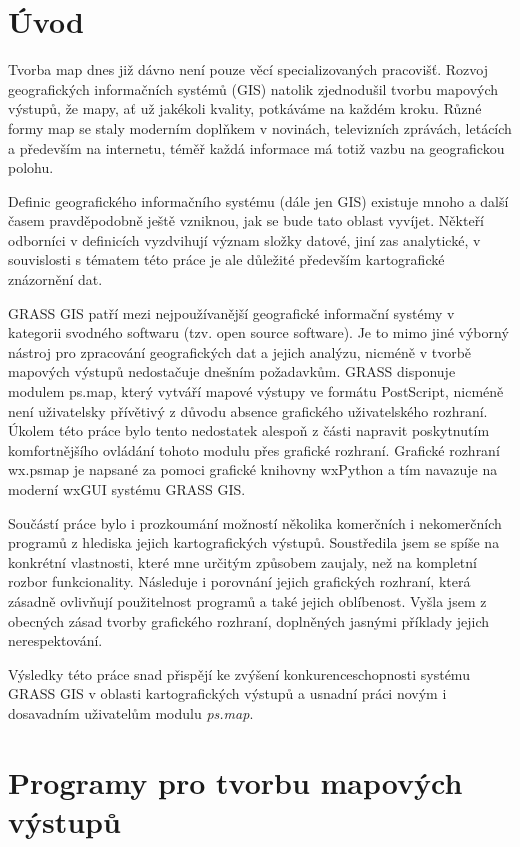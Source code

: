 \documentclass[a4paper,12pt,draft]{article}
\author{Anna Kratochvílová}
\newcommand{\modul}[1]{\emph{#1}}
\begin{document}
\tableofcontents
\renewcommand{\refname}{Použité zdroje}

\section{Úvod}
Tvorba map dnes již dávno není pouze věcí specializovaných
pracovišť. Rozvoj geografických informačních systémů (GIS) natolik
zjednodušil tvorbu mapových výstupů, že mapy, ať už jakékoli kvality,
potkáváme na každém kroku. Různé formy map se staly moderním doplňkem
v novinách, televizních zprávách, letácích a především na internetu,
téměř každá informace má totiž vazbu na geografickou polohu.

Definic geografického informačního systému (dále jen GIS) existuje mnoho
a další časem pravděpodobně ještě vzniknou, jak se bude tato oblast
vyvíjet. Někteří odborníci v definicích vyzdvihují význam složky
datové, jiní zas analytické, v souvislosti s tématem této práce je
ale důležité především kartografické znázornění dat.

GRASS GIS patří mezi nejpoužívanější geografické informační systémy v kategorii
svodného softwaru (tzv. open source software). Je to mimo jiné výborný nástroj
pro zpracování geografických dat  a jejich analýzu, nicméně v tvorbě mapových
výstupů nedostačuje dnešním požadavkům. GRASS disponuje modulem ps.map, který
vytváří mapové výstupy ve formátu PostScript, nicméně není uživatelsky
přívětivý z důvodu absence grafického uživatelského rozhraní. Úkolem této práce
bylo tento nedostatek alespoň z části napravit  poskytnutím
komfortnějšího ovládání tohoto modulu přes grafické rozhraní.
Grafické rozhraní wx.psmap je napsané za pomoci grafické knihovny wxPython a tím
navazuje na moderní wxGUI systému GRASS GIS.

Součástí práce bylo i prozkoumání možností několika komerčních i nekomerčních
programů z hlediska jejich kartografických výstupů. Soustředila jsem se spíše
na konkrétní vlastnosti, které mne určitým způsobem zaujaly, než na kompletní
rozbor funkcionality. Následuje i porovnání jejich grafických rozhraní, která
zásadně ovlivňují použitelnost programů a také jejich oblíbenost. Vyšla jsem z
obecných zásad tvorby grafického rozhraní, doplněných jasnými příklady jejich
nerespektování. 

Výsledky této práce snad přispějí ke zvýšení konkurenceschopnosti systému GRASS
GIS v oblasti kartografických výstupů a usnadní práci novým i dosavadním
uživatelům modulu \modul{ps.map}. 
\section{Programy pro tvorbu mapových výstupů}
\end{document}
